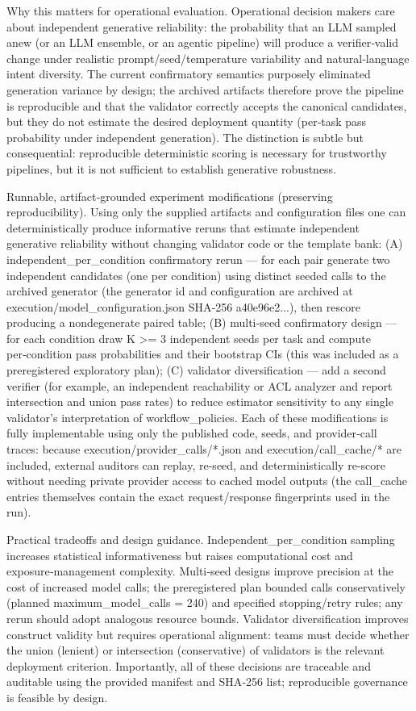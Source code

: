 \documentclass[conference]{IEEEtran}
\begin{document}
Why this matters for operational evaluation. Operational decision makers care about independent generative reliability: the probability that an LLM sampled anew (or an LLM ensemble, or an agentic pipeline) will produce a verifier‑valid change under realistic prompt/seed/temperature variability and natural‑language intent diversity. The current confirmatory semantics purposely eliminated generation variance by design; the archived artifacts therefore prove the pipeline is reproducible and that the validator correctly accepts the canonical candidates, but they do not estimate the desired deployment quantity (per‑task pass probability under independent generation). The distinction is subtle but consequential: reproducible deterministic scoring is necessary for trustworthy pipelines, but it is not sufficient to establish generative robustness.

Runnable, artifact‑grounded experiment modifications (preserving reproducibility). Using only the supplied artifacts and configuration files one can deterministically produce informative reruns that estimate independent generative reliability without changing validator code or the template bank: (A) independent\_per\_condition confirmatory rerun --- for each pair generate two independent candidates (one per condition) using distinct seeded calls to the archived generator (the generator id and configuration are archived at execution/model\_configuration.json SHA‑256 a40e96e2...), then rescore producing a nondegenerate paired table; (B) multi‑seed confirmatory design --- for each condition draw K >= 3 independent seeds per task and compute per‑condition pass probabilities and their bootstrap CIs (this was included as a preregistered exploratory plan); (C) validator diversification --- add a second verifier (for example, an independent reachability or ACL analyzer and report intersection and union pass rates) to reduce estimator sensitivity to any single validator's interpretation of workflow\_policies. Each of these modifications is fully implementable using only the published code, seeds, and provider‑call traces: because execution/provider\_calls/*.json and execution/call\_cache/* are included, external auditors can replay, re-seed, and deterministically re-score without needing private provider access to cached model outputs (the call\_cache entries themselves contain the exact request/response fingerprints used in the run).

Practical tradeoffs and design guidance. Independent\_per\_condition sampling increases statistical informativeness but raises computational cost and exposure‑management complexity. Multi‑seed designs improve precision at the cost of increased model calls; the preregistered plan bounded calls conservatively (planned maximum\_model\_calls = 240) and specified stopping/retry rules; any rerun should adopt analogous resource bounds. Validator diversification improves construct validity but requires operational alignment: teams must decide whether the union (lenient) or intersection (conservative) of validators is the relevant deployment criterion. Importantly, all of these decisions are traceable and auditable using the provided manifest and SHA‑256 list; reproducible governance is feasible by design.
\end{document}
